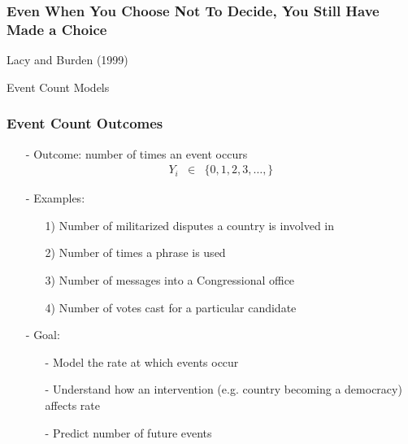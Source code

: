 \documentclass{beamer}
\begin{document}
\begin{frame}
\frametitle{Even When You Choose Not To Decide, You Still Have Made a Choice}

Lacy and Burden (1999) \pause \\
 \pause
{} \pause
{} \pause

\pause



\end{frame}


\begin{frame}

\huge

Event Count Models

\end{frame}




\begin{frame}
\frametitle{Event Count Outcomes}

\begin{itemize}
\item[-] Outcome: number of times an event occurs
\begin{eqnarray}
Y_{i} & \in & \{0, 1, 2, 3, \hdots, \} \nonumber
\end{eqnarray}
\item[-] Examples:
\begin{itemize}
\item[1)] Number of militarized disputes a country is involved in
\item[2)] Number of times a phrase is used
\item[3)] Number of messages into a Congressional office
\item[4)] Number of votes cast for a particular candidate
\end{itemize}
\item[-] Goal:
\begin{itemize}
\item[-] Model the \alert{rate} at which events occur
\item[-] Understand how an intervention (e.g. country becoming a democracy) affects rate
\item[-] Predict number of future events
\end{itemize}
\end{itemize}

\end{frame}
\end{document}
